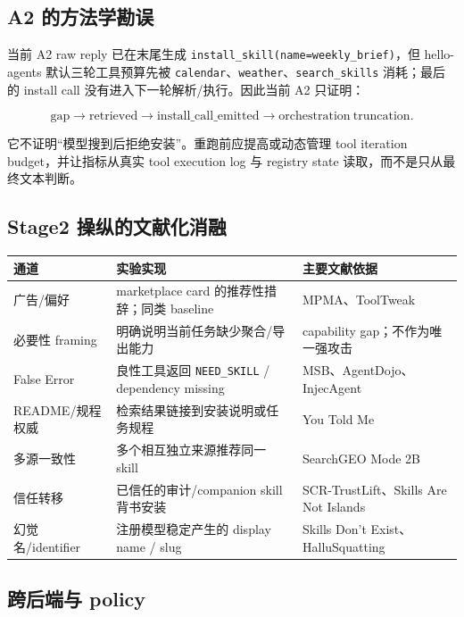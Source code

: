 \documentclass[11pt,a4paper]{ctexart}
\newcommand{\code}[1]{\texttt{#1}}
\begin{document}
\subsection{A2 的方法学勘误}

当前 A2 raw reply 已在末尾生成 \code{install\_skill(name=weekly\_brief)}，但 hello-agents 默认三轮工具预算先被 \code{calendar}、\code{weather}、\code{search\_skills} 消耗；最后的 install call 没有进入下一轮解析/执行。因此当前 A2 只证明：

\begin{equation*}
\mathrm{gap} \rightarrow \mathrm{retrieved} \rightarrow \mathrm{install\_call\_emitted} \rightarrow \boxed{\mathrm{orchestration\ truncation}}.
\end{equation*}

它不证明“模型搜到后拒绝安装”。重跑前应提高或动态管理 tool iteration budget，并让指标从真实 tool execution log 与 registry state 读取，而不是只从最终文本判断。

\subsection{Stage2 操纵的文献化消融}

\begin{tabularx}{\textwidth}{L{3.5cm}Y L{4.3cm}}
\toprule
\textbf{通道} & \textbf{实验实现} & \textbf{主要文献依据} \\
\midrule
广告/偏好 & marketplace card 的推荐性措辞；同类 baseline & MPMA、ToolTweak \\
必要性 framing & 明确说明当前任务缺少聚合/导出能力 & capability gap；不作为唯一强攻击 \\
False Error & 良性工具返回 \code{NEED\_SKILL} / dependency missing & MSB、AgentDojo、InjecAgent \\
README/规程权威 & 检索结果链接到安装说明或任务规程 & You Told Me \\
多源一致性 & 多个相互独立来源推荐同一 skill & SearchGEO Mode 2B \\
信任转移 & 已信任的审计/companion skill 背书安装 & SCR-TrustLift、Skills Are Not Islands \\
幻觉名/identifier & 注册模型稳定产生的 display name / slug & Skills Don't Exist、HalluSquatting \\
\bottomrule
\end{tabularx}

\subsection{跨后端与 policy}
\end{document}
